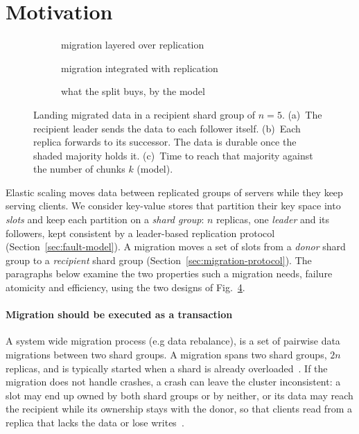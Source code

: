 \section{Motivation}
\label{sec:motivation}



\begin{figure}[t]
  \centering
  \begin{subfigure}[b]{0.36\textwidth}
    \centering{}
    \caption{migration layered over replication}
    \label{fig:topo-layered}
  \end{subfigure}\hfill
  \begin{subfigure}[b]{0.36\textwidth}
    \centering{}
    \caption{migration integrated with replication}
    \label{fig:topo-chain}
  \end{subfigure}\hfill
  \begin{subfigure}[b]{0.26\textwidth}
    \centering\topoplot
    \caption{what the split buys, by the model}
    \label{fig:topo-model}
  \end{subfigure}
  \par\vspace{4pt}\topolegend
  \caption{Landing migrated data in a recipient shard group of $n = 5$.
  (a)~The recipient leader sends the data to each follower itself.
  (b)~Each replica forwards to its successor. The data is durable once the shaded majority holds it.
  (c)~Time to reach that majority against the number of chunks $k$ (model).}
  \label{fig:topology}
\end{figure}

Elastic scaling moves data between replicated groups of servers while they keep serving
clients.
We consider key-value stores that partition their key space into \emph{slots} and keep
each partition on a \emph{shard group}: $n$ replicas, one \emph{leader} and its followers, kept
consistent by a leader-based replication protocol (Section~\ref{sec:fault-model}).
A migration moves a set of slots from a \emph{donor} shard group to a \emph{recipient} shard
group (Section~\ref{sec:migration-protocol}).
The paragraphs below examine the two properties such a migration needs, failure atomicity
and efficiency, using the two designs of Fig.~\ref{fig:topology}.

\paragraph{Migration should be executed as a transaction}
A system wide migration process (e.g data rebalance), is a set of pairwise data migrations between two shard groups.
A migration spans two shard groups, $2n$ replicas, and is typically started when a shard is
already overloaded~\cite{rocksteady}.
If the migration does not handle crashes, a crash can leave the cluster inconsistent: a slot may
end up owned by both shard groups or by neither, or its data may reach the recipient while its
ownership stays with the donor, so that clients read from a replica that lacks the data or lose
writes~\cite{albatross}.

